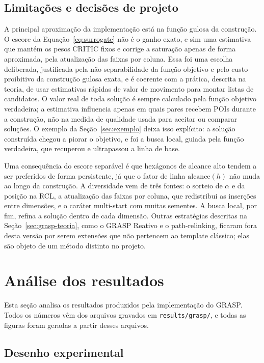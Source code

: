 \documentclass[11pt,a4paper]{article}
\newcommand{\code}[1]{\texttt{#1}}
\begin{document}
\subsection{Limitações e decisões de projeto}

A principal aproximação da implementação está na função gulosa da construção. O escore da Equação~\eqref{eq:surrogate} não é o ganho exato, e sim uma estimativa que mantém os pesos CRITIC fixos e corrige a saturação apenas de forma aproximada, pela atualização das faixas por coluna. Essa foi uma escolha deliberada, justificada pela não separabilidade da função objetivo e pelo custo proibitivo da construção gulosa exata, e é coerente com a prática, descrita na teoria, de usar estimativas rápidas de valor de movimento para montar listas de candidatos. O valor real de toda solução é sempre calculado pela função objetivo verdadeira; a estimativa influencia apenas em quais pares recebem POIs durante a construção, não na medida de qualidade usada para aceitar ou comparar soluções. O exemplo da Seção~\ref{sec:exemplo} deixa isso explícito: a solução construída chegou a piorar o objetivo, e foi a busca local, guiada pela função verdadeira, que recuperou e ultrapassou a linha de base.

Uma consequência do escore separável é que hexágonos de alcance alto tendem a ser preferidos de forma persistente, já que o fator de linha $\text{alcance}(h)$ não muda ao longo da construção. A diversidade vem de três fontes: o sorteio de $\alpha$ e da posição na RCL, a atualização das faixas por coluna, que redistribui as inserções entre dimensões, e o caráter multi-start com muitas sementes. A busca local, por fim, refina a solução dentro de cada dimensão. Outras estratégias descritas na Seção~\ref{sec:grasp-teoria}, como o GRASP Reativo e o path-relinking, ficaram fora desta versão por serem extensões que não pertencem ao template clássico; elas são objeto de um método distinto no projeto.

\section{Análise dos resultados}
\label{sec:grasp-analise}

Esta seção analisa os resultados produzidos pela implementação do GRASP. Todos os números vêm dos arquivos gravados em \code{results/grasp/}, e todas as figuras foram geradas a partir desses arquivos.

\subsection{Desenho experimental}
\end{document}
